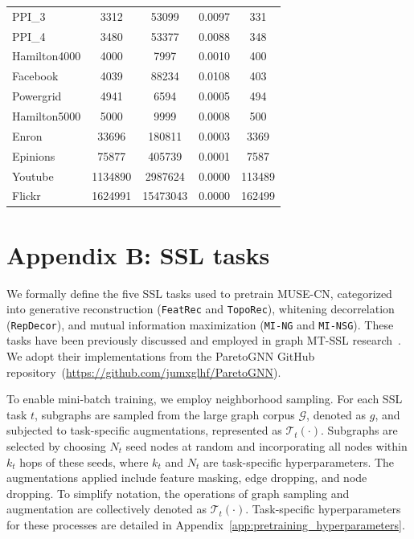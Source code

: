 \documentclass{article}
\newcommand{\featrec}{\texttt{FeatRec}\xspace}
\newcommand{\toporec}{\texttt{TopoRec}\xspace}
\newcommand{\repdecor}{\texttt{RepDecor}\xspace}
\newcommand{\ming}{\texttt{MI-NG}\xspace}
\newcommand{\minsg}{\texttt{MI-NSG}\xspace}
\begin{document}
\begin{table}[htbp]
{\begin{tabular}{|l|c|c|c|c|}
    PPI\_3 & 3312 & 53099 & 0.0097 & 331 \\
    PPI\_4 & 3480 & 53377 & 0.0088 & 348 \\
    Hamilton4000 & 4000 & 7997 & 0.0010 & 400 \\
    Facebook & 4039 & 88234 & 0.0108 & 403 \\
    Powergrid & 4941 & 6594 & 0.0005 & 494 \\
    Hamilton5000 & 5000 & 9999 & 0.0008 & 500 \\
    Enron & 33696 & 180811 & 0.0003 & 3369 \\
    Epinions & 75877 & 405739 & 0.0001 & 7587 \\
    Youtube & 1134890 & 2987624 & 0.0000 & 113489 \\
    Flickr & 1624991 & 15473043 & 0.0000 & 162499 \\
    \hline
    \end{tabular}
    }
\end{table}
\clearpage


\section{Appendix B: SSL tasks}
\label{app:ssl_tasks}


We formally define the five SSL tasks used to pretrain MUSE-CN, categorized into generative reconstruction (\featrec and \toporec), whitening decorrelation (\repdecor), and mutual information maximization (\ming and \minsg). These tasks have been previously discussed and employed in graph MT-SSL research~\cite{ju2022multi,khoshbakhtian2024mega}. We adopt their implementations from the ParetoGNN GitHub repository~(\url{https://github.com/jumxglhf/ParetoGNN}).

To enable mini-batch training, we employ neighborhood sampling. For each SSL task $t$, subgraphs are sampled from the large graph corpus $\mathcal{G}$, denoted as $g$, and subjected to task-specific augmentations, represented as $\mathcal{T}_t(\cdot)$. Subgraphs are selected by choosing $N_t$ seed nodes at random and incorporating all nodes within $k_t$ hops of these seeds, where $k_t$ and $N_t$ are task-specific hyperparameters. The augmentations applied include feature masking, edge dropping, and node dropping. To simplify notation, the operations of graph sampling and augmentation are collectively denoted as $\mathcal{T}_t(\cdot)$. Task-specific hyperparameters for these processes are detailed in Appendix~\ref{app:pretraining_hyperparameters}.
\end{document}
